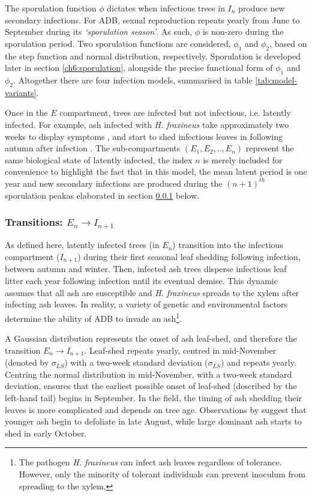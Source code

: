 The sporulation function $\phi$ dictates when infectious trees in $I_n$ produce new secondary infections. 
For ADB, sexual reproduction repeats yearly from June to September during its \textit{`sporulation season'}.
As such, $\phi$ is non-zero during the sporulation period.
Two sporulation functions are considered, $\phi_1$ and $\phi_2$, based on the step function and normal distribution, respectively.
Sporulation is developed later in section \ref{ch6:sporulation}, alongside the precise functional form of $\phi_1$ and $\phi_2$.
Altogether there are four infection models, summarised in table \ref{tab:model-variants}.

Once in the $E$ compartment, trees are infected but not infectious, i.e. latently infected.
For example, ash infected with \textit{H. fraxineus} take approximately two weeks to display 
symptoms \cite{https://doi.org/10.1111/ppa.12048, https://doi.org/10.1111/ppa.12844},
and start to shed infectious leaves in following autumn after infection \cite{gross2014h}.
The sub-compartments $(E_1, E_2,..,E_n)$ represent the same biological state of latently infected,
the index $n$ is merely included for convenience to highlight the fact that in this model, 
the mean latent period is one year and new secondary infections are produced during the $(n+1)^{th}$ sporulation peak\textemdash as elaborated in section \ref{sec:En-In+1} below.

\subsubsection{Transitions: $E_n\rightarrow I_{n+1}$}
\label{sec:En-In+1}

As defined here, latently infected trees (in $E_n$) transition into the infectious compartment ($I_{n+1}$) during their 
first seasonal leaf shedding following infection, between autumn and winter.
Then, infected ash trees disperse infectious leaf litter each year following infection until its eventual demise. 
This dynamic assumes that all ash are susceptible and \textit{H. fraxineus} spreads to the xylem after infecting ash leaves.
In reality, a variety of genetic and environmental factors determine the ability of ADB to invade an ash\footnote{
The pathogen \textit{H. fraxineus} can infect ash leaves regardless of tolerance. 
However, only the minority of tolerant individuals can prevent inoculum from spreading to the xylem.}.

A Gaussian distribution represents the onset of ash leaf-shed, and therefore the transition $E_n\rightarrow I_{n+1}$.
Leaf-shed repeats yearly, centred in mid-November (denoted by $\sigma_{LS}$) with a two-week standard deviation ($\sigma_{LS}$) 
and repeats yearly. Centring the normal distribution in mid-November, with a two-week standard deviation, ensures that the earliest
possible onset of leaf-shed (described by the left-hand tail) begins in September.
In the field, the timing of ash shedding their leaves is more complicated and depends on tree age. 
Observations by \cite{hietala2013invasive} suggest that younger ash begin to defoliate in late August,
while large dominant ash starts to shed in early October.


